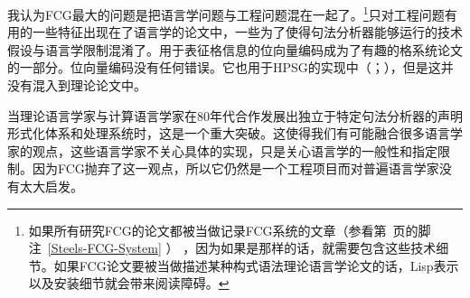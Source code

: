 我认为FCG最大的问题是把语言学问题与工程问题混在一起了。\footnote{
如果所有研究FCG的论文都被当做记录FCG系统的文章（参看第~\pageref{Steels-FCG-System}页的脚注~\ref{Steels-FCG-System} ） ，因为如果是那样的话，就需要包含这些技术细节。如果FCG论文要被当做描述某种构式语法理论语言学论文的话，Lisp表示以及安装细节就会带来阅读障碍。
}只对工程问题有用的一些特征出现在了语言学的论文中，一些为了使得句法分析器能够运行的技术假设与语言学限制混淆了。用于表征格信息的位向量编码成为了有趣的格系统论文的一部分。位向量编码没有任何错误。它也用于HPSG的实现中（\citealp[]{Reape91}；\citealp[]{Babel}），但是这并没有混入到理论论文中。

当理论语言学家与计算语言学家在80年代合作发展出独立于特定句法分析器的声明形式化体系和处理系统时，这是一个重大突破。这使得我们有可能融合很多语言学家的观点，这些语言学家不关心具体的实现，只是关心语言学的一般性和指定限制。因为FCG抛弃了这一观点，所以它仍然是一个工程项目而对普遍语言学家没有太大启发。
\indexhpsgend\indexsbcgend

